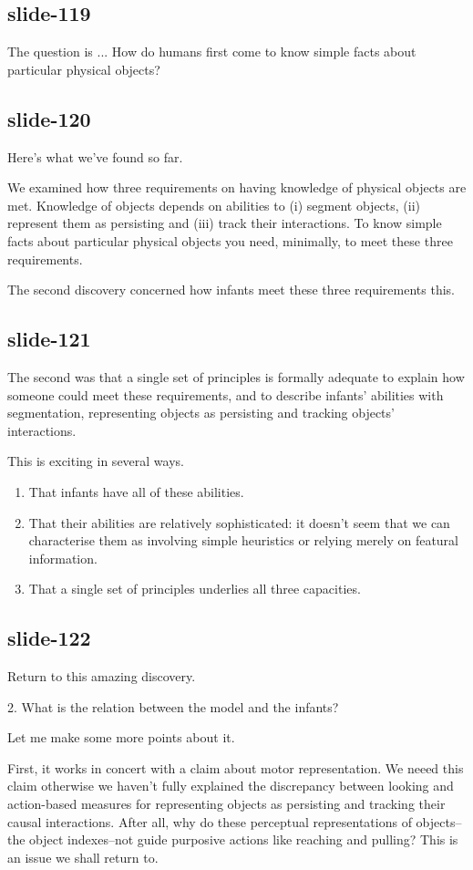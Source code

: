 \documentclass[12pt,\papersize]{extarticle}
\begin{document}
\subsection{slide-119}
The question is ...
How do humans first come to know simple facts about particular physical objects?

\subsection{slide-120}
Here’s what we’ve found so far.

We examined how three requirements on having knowledge of physical objects are met.
Knowledge of objects depends on abilities to (i) segment objects, (ii) represent them as
persisting and (iii) track their interactions.
To know simple facts about particular physical objects you need, minimally,
to meet these three requirements.

The second discovery concerned how infants meet these three requirements this.

\subsection{slide-121}
The second was that a single set of principles is formally adequate to
explain how someone could meet these requirements, and to describe
infants' abilities with segmentation, representing objects as persisting
and tracking objects' interactions.

This is exciting in several ways.
\begin{enumerate}
\item That infants have all of these abilities.
\item That their abilities are relatively sophisticated: it doesn’t seem
that we can characterise them as involving simple heuristics or relying
merely on featural information.
\item That a single set of principles underlies all three capacities.
\end{enumerate}

\subsection{slide-122}
Return to this amazing discovery.

2. What is the relation between the model and the infants?

Let me make some more points about it.

First, it works in concert with a claim about motor representation.
We neeed this claim otherwise we haven't fully explained the discrepancy between looking and
action-based measures for representing objects as persisting and tracking their causal
interactions.
After all, why do these perceptual representations of objects--the object indexes--not guide
purposive actions like reaching and pulling?
This is an issue we shall return to.
\end{document}
